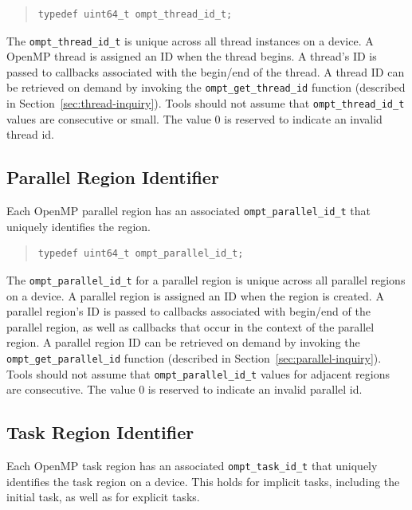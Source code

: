 \documentclass{article}
\begin{document}
\begin{quote}
\begin{verbatim}
typedef uint64_t ompt_thread_id_t;
\end{verbatim}
\end{quote}

\noindent
  The \verb|ompt_thread_id_t| is unique
  across all thread instances on a device.  A OpenMP thread is assigned an ID
  when the thread begins. A thread's ID is
  passed to callbacks associated with the begin/end of the
  thread. A thread ID can be retrieved
  on demand by invoking the  \verb|ompt_get_thread_id|   
  function (described in Section~\ref{sec:thread-inquiry}).
  Tools should not assume that \verb|ompt_thread_id_t| values are consecutive or small. 
  The value 0 is reserved to indicate an invalid thread id.



\subsection{Parallel Region Identifier}
  Each OpenMP parallel region has an associated
  \verb|ompt_parallel_id_t| that uniquely identifies the region.

\begin{quote}
\begin{verbatim}
typedef uint64_t ompt_parallel_id_t;
\end{verbatim}
\end{quote}

\noindent
  The \verb|ompt_parallel_id_t| for a parallel region is unique
  across all parallel regions on a device.  A parallel region is assigned an ID
  when the region is created. A parallel region's ID is
  passed to callbacks associated with begin/end of the
  parallel region, as well as callbacks that occur in the context of the parallel region.
  A parallel region ID can be retrieved
  on demand by invoking the \verb|ompt_get_parallel_id|  function (described in Section~\ref{sec:parallel-inquiry}).
  Tools should not assume that \verb|ompt_parallel_id_t| values for adjacent
  regions are consecutive. 
  The value 0 is reserved to indicate an invalid parallel id.
 
 
  \subsection{Task Region Identifier}
  Each OpenMP task region has an associated
  \verb|ompt_task_id_t| that uniquely identifies the task region on a device. 
  This holds for implicit tasks, including the initial task, as well as for explicit tasks.
\end{document}
